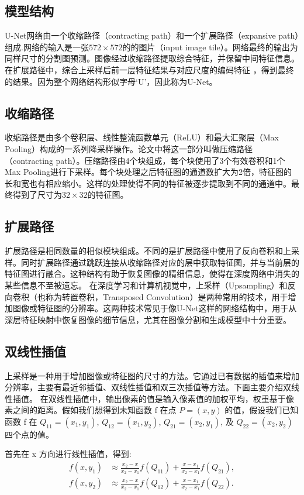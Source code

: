 \subsection{模型结构}
U-Net网络由一个收缩路径（contracting path）和一个扩展路径（expansive path）组成.网络的输入是一张$572\times 572$的的图片（input image tile）。网络最终的输出为同样尺寸的分割图预测。图像经过收缩路径提取综合特征，并保留中间特征信息。在扩展路径中，综合上采样后前一层特征结果与对应尺度的编码特征 ，得到最终的结果。因为整个网络结构形似字母‘U’，因此称为U-Net。
\subsection{收缩路径}
收缩路径是由多个卷积层、线性整流函数单元（ReLU）和最大汇聚层（Max Pooling）构成的一系列降采样操作。论文中将这一部分叫做压缩路径（contracting path）。压缩路径由4个块组成，每个块使用了3个有效卷积和1个Max Pooling进行下采样。每个块处理之后特征图的通道数扩大为2倍，特征图的长和宽也有相应缩小。这样的处理使得不同的特征被逐步提取到不同的通道中。最终得到了尺寸为$32\times 32$的特征图。
\subsection{扩展路径}
扩展路径是相同数量的相似模块组成。不同的是扩展路径中使用了反向卷积和上采样。同时扩展路径通过跳跃连接从收缩路径对应的层中获取特征图，并与当前层的特征图进行融合。这种结构有助于恢复图像的精细信息，使得在深度网络中消失的某些信息不至被遗忘。
在深度学习和计算机视觉中，上采样（Upsampling）和反向卷积（也称为转置卷积，Transposed Convolution）是两种常用的技术，用于增加图像或特征图的分辨率。这两种技术常见于像U-Net这样的网络结构中，用于从深层特征映射中恢复图像的细节信息，尤其在图像分割和生成模型中十分重要。

\subsection{双线性插值}
上采样是一种用于增加图像或特征图的尺寸的方法。它通过已有数据的插值来增加分辨率，主要有最近邻插值、双线性插值和双三次插值等方法。下面主要介绍双线性插值\cite{2022Upsamplingcomparativestudynewideas}。
在双线性插值中，输出像素的值是输入像素值的加权平均，权重基于像素之间的距离。假如我们想得到未知函数 f 在点 $P=\left( x, y\right)$ 的值，假设我们已知函数 f 在 $Q_{11} = \left( x_1, y_1 \right) $, $Q_{12} = \left( x_1, y_2 \right) $, $Q_{21} = \left( x_2, y_1 \right) $, 及 $Q_{22} = \left( x_2, y_2 \right) $ 四个点的值。 

首先在 x 方向进行线性插值，得到:
\begin{align}
f(x, y_1) &\approx \frac{x_2-x}{x_2-x_1} f(Q_{11}) + \frac{x-x_1}{x_2-x_1} f(Q_{21}), \\
f(x, y_2) &\approx \frac{x_2-x}{x_2-x_1} f(Q_{12}) + \frac{x-x_1}{x_2-x_1} f(Q_{22}).
\end{align}

